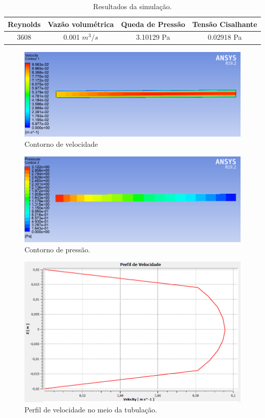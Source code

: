 \documentclass[12pt]{article}
\begin{document}
\begin{table}[ht]
\begin{center}
\begin{tabular}{cccc} 
\hline
\textbf{Reynolds} & \textbf{Vazão volumétrica} & \textbf{Queda de Pressão} & \textbf{Tensão Cisalhante}\\
\hline
3608 &   0.001 $m^3/s$ & 3.10129 Pa & 0.02918 Pa \\
\hline
\end{tabular}
\caption{Resultados da simulação.}
\label{tbl:resultados} %
\end{center}
\end{table}

\begin{figure}[H]
    \centering
    \includegraphics[width=.5\textwidth]{fig/velocity_contour_turbulent.png}
    \caption{Contorno de velocidade}
		\label{fig:isometric}
\end{figure}

\begin{figure}[H]
    \centering
    \includegraphics[width=.5\textwidth]{fig/pressure_contour_turbulent.png}
    \caption{Contorno de pressão.}
		\label{fig:isometric}
\end{figure}

\begin{figure}[H]
    \centering
    \includegraphics[width=.5\textwidth]{fig/velocity_profile_turbulent.png}
    \caption{Perfil de velocidade no meio da tubulação.}
		\label{fig:isometric}
\end{figure}
\end{document}

